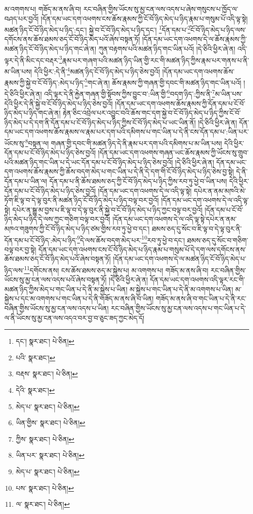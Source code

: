 མ་འགགས་པ། གཟོད་མ་ནས་ཞི་བ། རང་བཞིན་གྱིས་ཡོངས་སུ་མྱ་ངན་ལས་འདས་པ་ཞེས་གསུངས་པ་ཁྱོད་ལ་བཤད་པར་བྱའོ། །དོན་དམ་ཡང་དག་འཕགས་ངས་ཆོས་རྣམས་ཀྱི་ངོ་བོ་ཉིད་མེད་པ་ཉིད་རྣམ་པ་གསུམ་པོ་འདི་ལྟ་སྟེ། མཚན་ཉིད་ངོ་བོ་ཉིད་མེད་པ་ཉིད་:དང་། སྐྱེ་བ་ངོ་བོ་ཉིད་མེད་པ་ཉིད་དང་། \footnote{དང་།    སྣར་ཐང་།  པེ་ཅིན། }དོན་དམ་པ་\footnote{པའི་  སྣར་ཐང་། }ངོ་བོ་ཉིད་མེད་པ་ཉིད་ལས་དགོངས་ནས་ཆོས་ཐམས་ཅད་ངོ་བོ་ཉིད་མེད་པའོ་ཞེས་བསྟན་ཏོ། །དོན་དམ་ཡང་དག་འཕགས་དེ་ལ་ཆོས་རྣམས་ཀྱི་མཚན་ཉིད་ངོ་བོ་ཉིད་མེད་པ་ཉིད་གང་ཞེ་ན། ཀུན་བརྟགས་པའི་མཚན་ཉིད་གང་ཡིན་པའོ། །དེ་ཅིའི་ཕྱིར་ཞེ་ན། འདི་ལྟར་དེ་ནི་མིང་དང་བརྡར་\footnote{བརྡས་  སྣར་ཐང་།  པེ་ཅིན། }རྣམ་པར་གཞག་པའི་མཚན་ཉིད་ཡིན་གྱི་རང་གི་མཚན་ཉིད་ཀྱིས་རྣམ་པར་གནས་པ་ནི་མ་ཡིན་པས། དེའི་ཕྱིར་:དེ་ནི་\footnote{དེའི་  སྣར་ཐང་། }མཚན་ཉིད་ངོ་བོ་ཉིད་མེད་པ་ཉིད་ཅེས་བྱའོ། །དོན་དམ་ཡང་དག་འཕགས་ཆོས་རྣམས་ཀྱི་སྐྱེ་བ་ངོ་བོ་ཉིད་:མེད་པ་ཉིད་\footnote{མེད་པ་  སྣར་ཐང་།  པེ་ཅིན། }གང་ཞེ་ན། ཆོས་རྣམས་ཀྱི་གཞན་གྱི་དབང་གི་མཚན་ཉིད་གང་ཡིན་པའོ། །དེ་ཅིའི་ཕྱིར་ཞེ་ན། འདི་ལྟར་དེ་ནི་རྐྱེན་གཞན་གྱི་སྟོབས་ཀྱིས་བྱུང་བ་:ཡིན་གྱི་\footnote{ཡིན་གྱིས་  སྣར་ཐང་།  པེ་ཅིན། }བདག་ཉིད་:ཀྱིས་ནི་\footnote{ཀྱིས་  སྣར་ཐང་།  པེ་ཅིན། }མ་ཡིན་པས་དེའི་ཕྱིར་དེ་ནི་སྐྱེ་བ་ངོ་བོ་ཉིད་མེད་པ་ཉིད་ཅེས་བྱའོ། །དོན་དམ་ཡང་དག་འཕགས་ཆོས་རྣམས་ཀྱི་དོན་དམ་པ་ངོ་བོ་ཉིད་མེད་པ་ཉིད་གང་ཞེ་ན། རྟེན་ཅིང་འབྲེལ་པར་འབྱུང་བའི་ཆོས་གང་དག་སྐྱེ་བ་ངོ་བོ་ཉིད་མེད་པ་ཉིད་ཀྱིས་ངོ་བོ་ཉིད་མེད་པ་དེ་དག་ནི་དོན་དམ་པ་ངོ་བོ་ཉིད་མེད་པ་ཉིད་ཀྱིས་ངོ་བོ་ཉིད་མེད་པ་ཡང་ཡིན་ནོ། །དེ་ཅིའི་ཕྱིར་ཞེ་ན། དོན་དམ་ཡང་དག་འཕགས་ཆོས་རྣམས་ལ་རྣམ་པར་དག་པའི་དམིགས་པ་གང་ཡིན་པ་དེ་ནི་ངས་དོན་དམ་པ་:ཡིན་པར་ཡོངས་སུ་\footnote{ཡིན་པར་  སྣར་ཐང་།  པེ་ཅིན། }བསྟན་ལ། གཞན་གྱི་དབང་གི་མཚན་ཉིད་དེ་ནི་རྣམ་པར་དག་པའི་དམིགས་པ་མ་ཡིན་པས། དེའི་ཕྱིར་དོན་དམ་པ་ངོ་བོ་ཉིད་མེད་པ་ཉིད་ཅེས་བྱའོ། །དོན་དམ་ཡང་དག་འཕགས་གཞན་ཡང་ཆོས་རྣམས་ཀྱི་ཡོངས་སུ་གྲུབ་པའི་མཚན་ཉིད་གང་ཡིན་པ་དེ་ཡང་དོན་དམ་པ་ངོ་བོ་ཉིད་མེད་པ་ཉིད་ཅེས་བྱའོ། །དེ་ཅིའི་ཕྱིར་ཞེ་ན། དོན་དམ་ཡང་དག་འཕགས་ཆོས་རྣམས་ཀྱི་ཆོས་བདག་མེད་པ་གང་ཡིན་པ་དེ་ནི་དེ་དག་གི་ངོ་བོ་ཉིད་མེད་པ་ཉིད་ཅེས་བྱ་སྟེ། དེ་ནི་དོན་དམ་པ་ཡིན་ལ། དོན་དམ་པ་ནི་ཆོས་ཐམས་ཅད་ཀྱི་ངོ་བོ་ཉིད་མེད་པ་ཉིད་ཀྱིས་རབ་ཏུ་ཕྱེ་བ་ཡིན་པས། དེའི་ཕྱིར་དོན་དམ་པ་ངོ་བོ་ཉིད་མེད་པ་ཉིད་ཅེས་བྱའོ། །དོན་དམ་ཡང་དག་འཕགས་དེ་ལ་འདི་ལྟ་སྟེ། དཔེར་ན་ནམ་མཁའི་མེ་ཏོག་ཇི་ལྟ་བ་དེ་ལྟ་བུར་ནི་མཚན་ཉིད་ངོ་བོ་ཉིད་མེད་པ་ཉིད་བལྟ་བར་བྱའོ། །དོན་དམ་ཡང་དག་འཕགས་དེ་ལ་འདི་ལྟ་སྟེ། དཔེར་ན་སྒྱུ་མ་བྱས་པ་ཇི་ལྟ་བ་དེ་ལྟ་བུར་ནི་སྐྱེ་བ་ངོ་བོ་ཉིད་མེད་པ་ཉིད་ཀྱང་བལྟ་བར་བྱའོ། །དོན་དམ་པ་ངོ་བོ་ཉིད་མེད་པ་ཉིད་དེ་ལས་ཀྱང་གཅིག་བལྟ་བར་བྱའོ། །དོན་དམ་ཡང་དག་འཕགས་དེ་ལ་འདི་ལྟ་སྟེ་དཔེར་ན་ནམ་མཁའ་གཟུགས་ཀྱི་ངོ་བོ་ཉིད་མེད་པ་ཉིད་ཙམ་གྱིས་རབ་ཏུ་ཕྱེ་བ་དང་། ཐམས་ཅད་དུ་སོང་བ་ཇི་ལྟ་བ་དེ་ལྟ་བུར་ནི་དོན་དམ་པ་ངོ་བོ་ཉིད་:མེད་པ་ཉིད་\footnote{མེད་པ་  སྣར་ཐང་།  པེ་ཅིན། }དེ་ལས་ཆོས་བདག་མེད་པར་\footnote{པས་  སྣར་ཐང་།  པེ་ཅིན། }རབ་ཏུ་ཕྱེ་བ་དང་། ཐམས་ཅད་དུ་སོང་བ་གཅིག་བལྟ་བར་བྱ་སྟེ། དོན་དམ་ཡང་དག་འཕགས་ངས་ངོ་བོ་ཉིད་མེད་པ་ཉིད་རྣམ་པ་གསུམ་པོ་དེ་དག་ལས་དགོངས་ནས་ཆོས་ཐམས་ཅད་ངོ་བོ་ཉིད་མེད་པའོ་ཞེས་བསྟན་ཏོ། །དོན་དམ་ཡང་དག་འཕགས་དེ་ལ་མཚན་ཉིད་ངོ་བོ་ཉིད་མེད་པ་ཉིད་ལས་\footnote{ལ་  སྣར་ཐང་།  པེ་ཅིན། }དགོངས་ནས། ངས་ཆོས་ཐམས་ཅད་མ་སྐྱེས་པ། མ་འགགས་པ། གཟོད་མ་ནས་ཞི་བ། རང་བཞིན་གྱིས་ཡོངས་སུ་མྱ་ངན་ལས་འདས་པའོ་ཞེས་བསྟན་ཏོ། །དེ་ཅིའི་ཕྱིར་ཞེ་ན། དོན་དམ་ཡང་དག་འཕགས་འདི་ལྟར་རང་གི་མཚན་ཉིད་ཀྱིས་མེད་པ་གང་ཡིན་པ་དེ་ནི་མ་སྐྱེས་པ་ཡིན། མ་སྐྱེས་པ་གང་ཡིན་པ་དེ་ནི་མ་འགགས་པ་ཡིན། མ་སྐྱེས་པ་དང་མ་འགགས་པ་གང་ཡིན་པ་དེ་ནི་གཟོད་མ་ནས་ཞི་བ་ཡིན། གཟོད་མ་ནས་ཞི་བ་གང་ཡིན་པ་དེ་ནི་རང་བཞིན་གྱིས་ཡོངས་སུ་མྱ་ངན་ལས་འདས་པ་ཡིན། རང་བཞིན་གྱིས་ཡོངས་སུ་མྱ་ངན་ལས་འདས་པ་གང་ཡིན་པ་དེ་ལ་ནི་ཡོངས་སུ་མྱ་ངན་ལས་འདའ་བར་བྱ་བ་ཅུང་ཟད་ཀྱང་མེད་དོ། 
